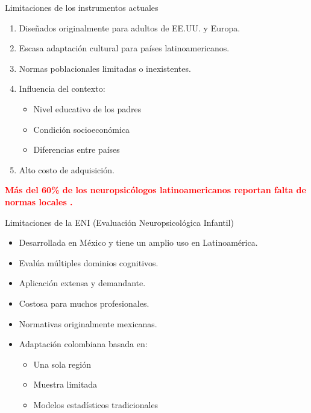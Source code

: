 \documentclass[aspectratio=169]{beamer}
\begin{document}
\begin{frame}{Limitaciones de los instrumentos actuales}
	
		\begin{enumerate}
			\item Diseñados originalmente para adultos de EE.UU. y Europa.
			\vspace{7pt}
			\item Escasa adaptación cultural para países latinoamericanos.
			\vspace{7pt}
			\item Normas poblacionales limitadas o inexistentes.
			\vspace{7pt}
			\item Influencia del contexto:
			\begin{itemize}
				\item Nivel educativo de los padres
				\item Condición socioeconómica
				\item Diferencias entre países
			\end{itemize}
			\vspace{7pt}
			\item Alto costo de adquisición.
		\end{enumerate}
	
	\vspace{0.3cm}
	
	\textcolor{red}{\bf Más del 60\% de los neuropsicólogos latinoamericanos reportan falta de normas locales \citep{Arango-Lasprilla04072017}.}
	
\end{frame}


\begin{frame}{Limitaciones de la ENI (Evaluación Neuropsicológica Infantil)}
	
	\begin{itemize}
		\item Desarrollada en México y tiene un amplio uso en Latinoamérica.
		\vspace{7pt}
		\item Evalúa múltiples dominios cognitivos.
		\vspace{7pt}
		\item Aplicación extensa y demandante.
		\vspace{7pt}
		\item Costosa para muchos profesionales.
		\vspace{7pt}
		\item Normativas originalmente mexicanas.
		\vspace{7pt}
		\item Adaptación colombiana basada en:
		\begin{itemize}
			\item Una sola región
			\item Muestra limitada
			\item Modelos estadísticos tradicionales
		\end{itemize}
	\end{itemize}
	
\end{frame}
\end{document}
